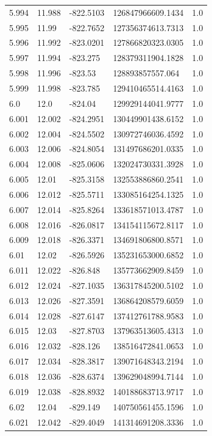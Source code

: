 \begin{tabular}{lllll}
5.994 & 11.988 & -822.5103 & 126847966609.1434 & 1.0 \\
5.995 & 11.99 & -822.7652 & 127356374613.7313 & 1.0 \\
5.996 & 11.992 & -823.0201 & 127866820323.0305 & 1.0 \\
5.997 & 11.994 & -823.275 & 128379311904.1828 & 1.0 \\
5.998 & 11.996 & -823.53 & 128893857557.064 & 1.0 \\
5.999 & 11.998 & -823.785 & 129410465514.4163 & 1.0 \\
6.0 & 12.0 & -824.04 & 129929144041.9777 & 1.0 \\
6.001 & 12.002 & -824.2951 & 130449901438.6152 & 1.0 \\
6.002 & 12.004 & -824.5502 & 130972746036.4592 & 1.0 \\
6.003 & 12.006 & -824.8054 & 131497686201.0335 & 1.0 \\
6.004 & 12.008 & -825.0606 & 132024730331.3928 & 1.0 \\
6.005 & 12.01 & -825.3158 & 132553886860.2541 & 1.0 \\
6.006 & 12.012 & -825.5711 & 133085164254.1325 & 1.0 \\
6.007 & 12.014 & -825.8264 & 133618571013.4787 & 1.0 \\
6.008 & 12.016 & -826.0817 & 134154115672.8117 & 1.0 \\
6.009 & 12.018 & -826.3371 & 134691806800.8571 & 1.0 \\
6.01 & 12.02 & -826.5926 & 135231653000.6852 & 1.0 \\
6.011 & 12.022 & -826.848 & 135773662909.8459 & 1.0 \\
6.012 & 12.024 & -827.1035 & 136317845200.5102 & 1.0 \\
6.013 & 12.026 & -827.3591 & 136864208579.6059 & 1.0 \\
6.014 & 12.028 & -827.6147 & 137412761788.9583 & 1.0 \\
6.015 & 12.03 & -827.8703 & 137963513605.4313 & 1.0 \\
6.016 & 12.032 & -828.126 & 138516472841.0653 & 1.0 \\
6.017 & 12.034 & -828.3817 & 139071648343.2194 & 1.0 \\
6.018 & 12.036 & -828.6374 & 139629048994.7144 & 1.0 \\
6.019 & 12.038 & -828.8932 & 140188683713.9717 & 1.0 \\
6.02 & 12.04 & -829.149 & 140750561455.1596 & 1.0 \\
6.021 & 12.042 & -829.4049 & 141314691208.3336 & 1.0 \\

\end{tabular}
